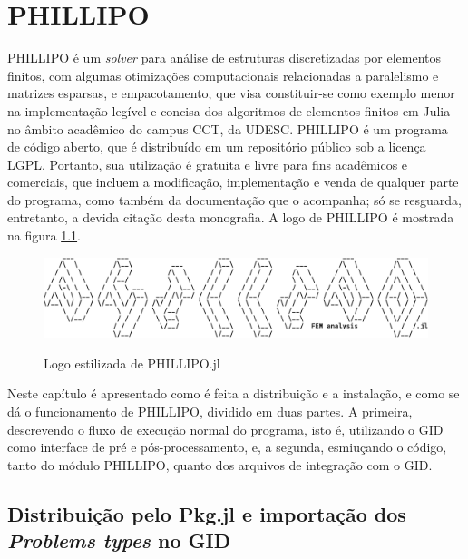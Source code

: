 \chapter{PHILLIPO}

PHILLIPO é um \emph{solver} para análise de estruturas discretizadas por elementos finitos, com algumas otimizações computacionais relacionadas a paralelismo e matrizes esparsas, e empacotamento, que visa constituir-se como exemplo menor na implementação legível e concisa dos algoritmos de elementos finitos em Julia no âmbito acadêmico do campus CCT, da UDESC. PHILLIPO é um programa de código aberto, que é distribuído em um repositório público\footnotemark[1]{} sob a licença LGPL\footnotemark[2]{}. Portanto, sua utilização é gratuita e livre para fins acadêmicos e comerciais, que incluem a modificação, implementação e venda de qualquer parte do programa, como também da documentação que o acompanha; só se resguarda, entretanto, a devida citação desta monografia. A logo de PHILLIPO é mostrada na figura \ref{fig:log_phillipo}.

\begin{figure}[hbtp!]
    \centering
    \caption{Logo estilizada de PHILLIPO.jl}
    \includegraphics[width = \textwidth]{Figuras/logo_phillipo.pdf}
    \label{fig:log_phillipo}
\end{figure}

Neste capítulo é apresentado como é feita a distribuição e a instalação, e como se dá o funcionamento de PHILLIPO, dividido em duas partes. A primeira, descrevendo o fluxo de execução normal do programa, isto é, utilizando o GID como interface de pré e pós-processamento, e, a segunda, esmiuçando o código, tanto do módulo PHILLIPO, quanto dos arquivos de integração com o GID.

\section{Distribuição pelo Pkg.jl e importação dos \emph{Problems types} no GID}

